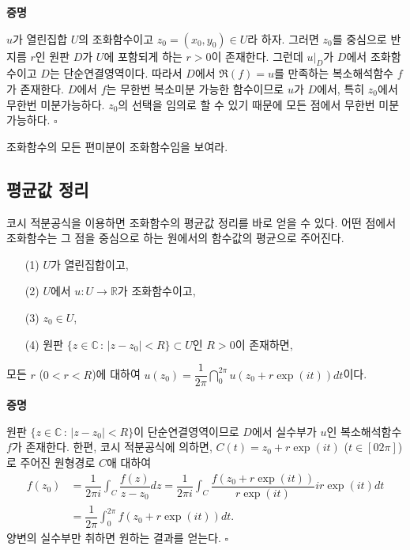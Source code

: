 {\bf 증명}

$u$가 열린집합 $U$의 조화함수이고 $z_0=(x_0,y_0) \in U$라 하자.
그러면 $z_0$를 중심으로 반지름 $r$인 원판 $D$가 $U$에  포함되게 하는 $r>0$이 존재한다.
그런데 $u|_D$가 $D$에서 조화함수이고 $D$는 단순연결영역이다.
따라서 $D$에서 $\Re(f)=u$를 만족하는 복소해석함수 $f$가 존재한다.
$D$에서 $f$는 무한번 복소미분 가능한 함수이므로
$u$가 $D$에서, 특히 $z_0$에서 무한번 미분가능하다.
$z_0$의 선택을 임의로 할 수 있기 때문에 모든 점에서 무한번 미분가능하다.
\hfill $\square$

\begin{salt_exercise}\label{ex-5-7}
조화함수의 모든 편미분이 조화함수임을 보여라.
\end{salt_exercise}

\subsection{평균값 정리}

코시 적분공식을 이용하면
조화함수의 평균값 정리를 바로 얻을 수 있다.
어떤 점에서 조화함수는 그 점을 중심으로 하는 원에서의 함수값의 평균으로 주어진다.

\begin{salttheorem}  {}{} \label{thm-5-3}

\begin{itemize}
\item[(1)] $U$가 열린집합이고,
\item[(2)] $U$에서 $u:U\to\mathbb R$가 조화함수이고,
\item[(3)] $z_0\in U$,
\item[(4)] 원판 $\{ z\in\mathbb C\,:\, |z-z_0|<R \} \subset U$인 $R>0$이 존재하면,
\end{itemize}
모든 $r$ ($0<r<R$)에 대하여
$u(z_0) = \dfrac1{2\pi} \dint_0^{2\pi} u(z_0 + r\exp(it))dt$이다.
\end{salttheorem}

{\bf 증명}

원판 $\{ z\in\mathbb C\,:\, |z-z_0|<R \} $이 단순연결영역이므로
$D$에서 실수부가 $u$인 복소해석함수 $f$가 존재한다.
한편, 코시 적분공식에 의하면, 
$C(t) = z_0 + r\exp(it)$ ($t\in[02\pi]$)로 주어진 원형경로 $C$애 대하여 
\begin{align*}
f(z_0) &= \dfrac1{2\pi i} \int_C \dfrac{f(z)}{z-z_0} dz
= \dfrac1{2\pi i} \int_C \dfrac{f(z_0+r\exp(it))}{r\exp(it)} ir\exp(it) dt\\
&= \dfrac1{2\pi} \int_0^{2\pi} f(z_0+r\exp(it)) dt.
\end{align*}
양변의 실수부만 취하면 원하는 결과를 얻는다.
\hfill $\square$

